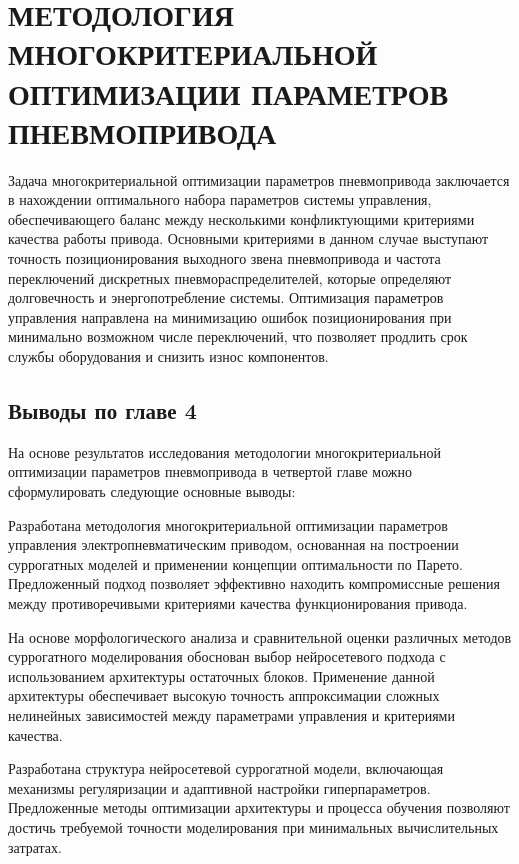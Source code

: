 \chapter{МЕТОДОЛОГИЯ МНОГОКРИТЕРИАЛЬНОЙ ОПТИМИЗАЦИИ ПАРАМЕТРОВ ПНЕВМОПРИВОДА}\label{ch:ch4}

Задача многокритериальной оптимизации параметров пневмопривода
заключается в нахождении оптимального набора параметров системы
управления, обеспечивающего баланс между несколькими конфликтующими
критериями качества работы привода. Основными критериями в данном случае
выступают точность позиционирования выходного звена пневмопривода и
частота переключений дискретных пневмораспределителей, которые определяют
долговечность и энергопотребление системы. Оптимизация параметров управления
направлена на минимизацию ошибок позиционирования при минимально возможном числе
переключений, что позволяет продлить срок службы оборудования и снизить износ компонентов.








\section{Выводы по главе 4}\label{sec:ch4/sec7}
На основе результатов исследования методологии многокритериальной оптимизации
параметров пневмопривода в четвертой главе можно сформулировать следующие основные выводы:

Разработана методология многокритериальной оптимизации параметров управления электропневматическим приводом,
основанная на построении суррогатных моделей и применении концепции оптимальности по Парето. Предложенный подход
позволяет эффективно находить компромиссные решения между противоречивыми критериями качества функционирования привода.

На основе морфологического анализа и сравнительной оценки различных методов суррогатного моделирования обоснован
выбор нейросетевого подхода с использованием архитектуры остаточных блоков. Применение данной архитектуры обеспечивает
высокую точность аппроксимации сложных нелинейных зависимостей между параметрами управления и критериями качества.

Разработана структура нейросетевой суррогатной модели, включающая механизмы регуляризации и адаптивной настройки
гиперпараметров. Предложенные методы оптимизации архитектуры и процесса обучения позволяют достичь требуемой точности моделирования при минимальных вычислительных затратах.

